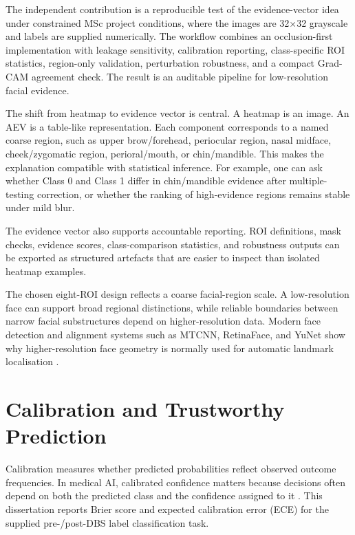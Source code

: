 The independent contribution is a reproducible test of the evidence-vector idea under constrained MSc project conditions, where the images are 32$\times$32 grayscale and labels are supplied numerically. The workflow combines an occlusion-first implementation with leakage sensitivity, calibration reporting, class-specific ROI statistics, region-only validation, perturbation robustness, and a compact Grad-CAM agreement check. The result is an auditable pipeline for low-resolution facial evidence.


The shift from heatmap to evidence vector is central. A heatmap is an image. An AEV is a table-like representation. Each component corresponds to a named coarse region, such as upper brow/forehead, periocular region, nasal midface, cheek/zygomatic region, perioral/mouth, or chin/mandible. This makes the explanation compatible with statistical inference. For example, one can ask whether Class 0 and Class 1 differ in chin/mandible evidence after multiple-testing correction, or whether the ranking of high-evidence regions remains stable under mild blur.


The evidence vector also supports accountable reporting. ROI definitions, mask checks, evidence scores, class-comparison statistics, and robustness outputs can be exported as structured artefacts that are easier to inspect than isolated heatmap examples.


The chosen eight-ROI design reflects a coarse facial-region scale. A low-resolution face can support broad regional distinctions, while reliable boundaries between narrow facial substructures depend on higher-resolution data. Modern face detection and alignment systems such as MTCNN, RetinaFace, and YuNet show why higher-resolution face geometry is normally used for automatic landmark localisation   .


\section{Calibration and Trustworthy Prediction}

Calibration measures whether predicted probabilities reflect observed outcome frequencies. In medical AI, calibrated confidence matters because decisions often depend on both the predicted class and the confidence assigned to it  . This dissertation reports Brier score and expected calibration error (ECE) for the supplied pre-/post-DBS label classification task.


